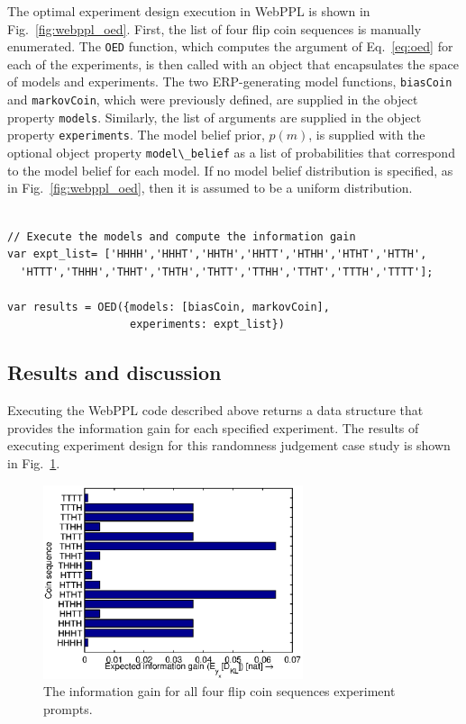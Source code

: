 \documentclass{article}
\begin{document}
The optimal experiment design execution in WebPPL is shown in Fig.~\ref{fig:webppl_oed}. First, the list of four flip coin sequences is manually enumerated. The \lstinline{OED} function, which computes the argument of Eq.~\ref{eq:oed} for each of the experiments, is then called with an object that encapsulates the space of models and experiments. The two ERP-generating model functions, \lstinline{biasCoin} and \lstinline{markovCoin}, which were previously defined, are supplied in the object property \lstinline{models}. Similarly, the list of arguments are supplied in the object property \lstinline{experiments}. The model belief prior, $p(m)$, is supplied with the optional object property \lstinline{model\_belief} as a list of probabilities that correspond to the model belief for each model. If no model belief distribution is specified, as in Fig.~\ref{fig:webppl_oed}, then it is assumed to be a uniform distribution.

\begin{lstlisting}[caption=Markov coin model]

// Execute the models and compute the information gain
var expt_list= ['HHHH','HHHT','HHTH','HHTT','HTHH','HTHT','HTTH',
  'HTTT','THHH','THHT','THTH','THTT','TTHH','TTHT','TTTH','TTTT'];

var results = OED({models: [biasCoin, markovCoin],
                   experiments: expt_list})

\end{lstlisting}

\subsection{Results and discussion}

Executing the WebPPL code described above returns a data structure that provides the information gain for each specified experiment. The results of executing experiment design for this randomness judgement case study is shown in Fig.~\ref{fig:coin}.

\begin{figure}[h!]
\centering
\includegraphics[width=3in]{img/coin.eps}
\caption{The information gain for all four flip coin sequences experiment prompts.}
\label{fig:coin}
\end{figure}
\end{document}
